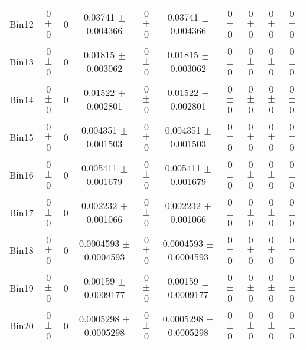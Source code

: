 \begin{tabular}{@{\extracolsep{4pt}}lccccccccc@{}}
     Bin12 & 0 $\pm$ 0 & 0 & 0.03741 $\pm$ 0.004366 & 0 $\pm$ 0 & 0.03741 $\pm$ 0.004366 & 0 $\pm$ 0 & 0 $\pm$ 0 & 0 $\pm$ 0 & 0 $\pm$ 0 \\ 
     Bin13 & 0 $\pm$ 0 & 0 & 0.01815 $\pm$ 0.003062 & 0 $\pm$ 0 & 0.01815 $\pm$ 0.003062 & 0 $\pm$ 0 & 0 $\pm$ 0 & 0 $\pm$ 0 & 0 $\pm$ 0 \\ 
     Bin14 & 0 $\pm$ 0 & 0 & 0.01522 $\pm$ 0.002801 & 0 $\pm$ 0 & 0.01522 $\pm$ 0.002801 & 0 $\pm$ 0 & 0 $\pm$ 0 & 0 $\pm$ 0 & 0 $\pm$ 0 \\ 
     Bin15 & 0 $\pm$ 0 & 0 & 0.004351 $\pm$ 0.001503 & 0 $\pm$ 0 & 0.004351 $\pm$ 0.001503 & 0 $\pm$ 0 & 0 $\pm$ 0 & 0 $\pm$ 0 & 0 $\pm$ 0 \\ 
     Bin16 & 0 $\pm$ 0 & 0 & 0.005411 $\pm$ 0.001679 & 0 $\pm$ 0 & 0.005411 $\pm$ 0.001679 & 0 $\pm$ 0 & 0 $\pm$ 0 & 0 $\pm$ 0 & 0 $\pm$ 0 \\ 
     Bin17 & 0 $\pm$ 0 & 0 & 0.002232 $\pm$ 0.001066 & 0 $\pm$ 0 & 0.002232 $\pm$ 0.001066 & 0 $\pm$ 0 & 0 $\pm$ 0 & 0 $\pm$ 0 & 0 $\pm$ 0 \\ 
     Bin18 & 0 $\pm$ 0 & 0 & 0.0004593 $\pm$ 0.0004593 & 0 $\pm$ 0 & 0.0004593 $\pm$ 0.0004593 & 0 $\pm$ 0 & 0 $\pm$ 0 & 0 $\pm$ 0 & 0 $\pm$ 0 \\ 
     Bin19 & 0 $\pm$ 0 & 0 & 0.00159 $\pm$ 0.0009177 & 0 $\pm$ 0 & 0.00159 $\pm$ 0.0009177 & 0 $\pm$ 0 & 0 $\pm$ 0 & 0 $\pm$ 0 & 0 $\pm$ 0 \\ 
     Bin20 & 0 $\pm$ 0 & 0 & 0.0005298 $\pm$ 0.0005298 & 0 $\pm$ 0 & 0.0005298 $\pm$ 0.0005298 & 0 $\pm$ 0 & 0 $\pm$ 0 & 0 $\pm$ 0 & 0 $\pm$ 0 \\ 
\hline\hline
  \end{tabular}
